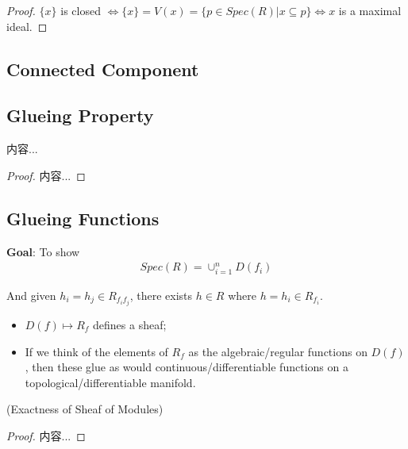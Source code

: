 \documentclass[Total.tex]{subfiles}
\begin{document}
					\begin{proof}
						$\{x\}$ is closed $\Leftrightarrow \{x\}=V(x)=\{p\in Spec(R)|x\subseteq p\}\Leftrightarrow x$ is a maximal ideal.
					\end{proof}
			
			\subsection{Connected Component}
			
			\subsection{Glueing Property}
				\begin{lemma}
					内容...
				\end{lemma}
				\begin{proof}
					内容...
				\end{proof}
			\subsection{Glueing Functions}
			
			\qquad \textbf{Goal}: To show
			\begin{gather*}
				Spec(R)=\cup_{i=1}^n D(f_i)
			\end{gather*}
			
			And given $h_i=h_j\in R_{f_if_j}$, there exists $h\in R$ where $h=h_i\in R_{f_i}$. 
			\begin{itemize}
				\item $D(f)\mapsto R_f$ defines a sheaf;
				\item If we think of the elements of $R_f$ as the algebraic/regular functions on $D(f)$, then these glue as would continuous/differentiable functions on a topological/differentiable manifold.
			\end{itemize}
			
			\begin{lemma}
				(Exactness of Sheaf of Modules)\label{Commutative-Algebra-Rings-Exactness-of-Modules}
			\end{lemma}
			\begin{proof}
				内容...
			\end{proof}
			
\end{document}
